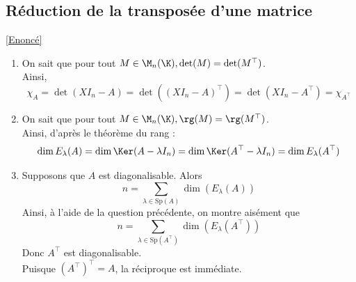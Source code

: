 \documentclass[8pt]{book}
\begin{document}
	\subsection{Réduction de la transposée d'une matrice }
	\label{Réduction de la transposée d'une matrice corrigé}
	\textcolor{blue}{\hyperref[Réduction de la transposée d'une matrice]{[Enoncé]}}\\
	\begin{enumerate}[leftmargin=*]
		\item On sait que pour tout $M\in\M_n(\K), \det(M)=\det(M^\top)$.\\
		Ainsi, \[\chi_A=\det(XI_n-A)=\det((XI_n-A)^\top)=\det(XI_n-A^\top)=\chi_{A^\top}\]
		\item On sait que pour tout $M\in\M_n(\K), \rg(M)=\rg(M^\top)$.\\
		Ainsi, d'après le théorème du rang : \[\dim E_\lambda(A)=\dim\Ker(A-\lambda I_n)=\dim\Ker(A^\top-\lambda I_n)=\dim E_\lambda(A^\top)\]
		\item Supposons que $A$ est diagonalisable. Alors \[n=\sum_{\lambda\in\text{Sp}(A)}\dim(E_\lambda(A))\]
		Ainsi, à l'aide de la question précédente, on montre aisément que \[n=\sum_{\lambda\in\text{Sp}(A^\top)}\dim(E_\lambda(A^\top))\]
		Donc $A^\top$ est diagonalisable.\\
		Puisque $(A^\top)^\top=A$, la réciproque est immédiate.
	\end{enumerate}
	
\end{document}
